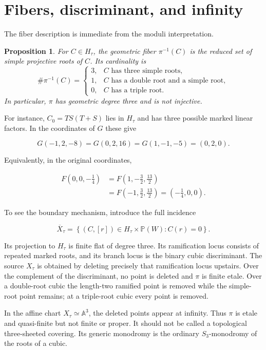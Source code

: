 \documentclass[11pt,a4paper]{article}
\newtheorem{proposition}[theorem]{Proposition}
\theoremstyle{remark}
\newcommand{\A}{\mathbb A}
\newcommand{\PP}{\mathbb P}
\begin{document}
\section{Fibers, discriminant, and infinity}

The fiber description is immediate from the moduli interpretation.

\begin{proposition}\label{prop:fibers}
For $C\in H_\tau$, the geometric fiber $\pi^{-1}(C)$ is the reduced set of
simple projective roots of $C$.  Its cardinality is
\[
  \#\pi^{-1}(C)=
  \begin{cases}
  3,&C\text{ has three simple roots},\\
  1,&C\text{ has a double root and a simple root},\\
  0,&C\text{ has a triple root}.
  \end{cases}
\]
In particular, $\pi$ has geometric degree three and is not injective.
\end{proposition}

For instance, $C_0=TS(T+S)$ lies in $H_\tau$ and has three possible marked
linear factors.  In the coordinates of $G$ these give

\[
  G(-1,2,-8)=G(0,2,16)=G(1,-1,-5)=(0,2,0).
\]

Equivalently, in the original coordinates,

\[
\begin{aligned}
F\left(0,0,-\frac14\right)
&=F\left(1,-\frac32,\frac{13}{2}\right)\\
&=F\left(-1,\frac32,\frac{13}{2}\right)
=\left(-\frac14,0,0\right).
\end{aligned}
\]

To see the boundary mechanism, introduce the full incidence

\[
  \overline X_\tau=
  \left\{(C,[r])\in H_\tau\times\PP(W):C(r)=0\right\}.
\]

Its projection to $H_\tau$ is finite flat of degree three.  Its ramification
locus consists of repeated marked roots, and its branch locus is the binary
cubic discriminant.  The source $X_\tau$ is obtained by deleting precisely
that ramification locus upstairs.  Over the complement of the discriminant,
no point is deleted and $\pi$ is finite etale.  Over a double-root cubic the
length-two ramified point is removed while the simple-root point remains; at
a triple-root cubic every point is removed.

In the affine chart $X_\tau\simeq\A^3$, the deleted points appear at infinity.
Thus $\pi$ is etale and quasi-finite but not finite or proper.  It should not
be called a topological three-sheeted covering.  Its generic monodromy is the
ordinary $S_3$-monodromy of the roots of a cubic.
\end{document}
